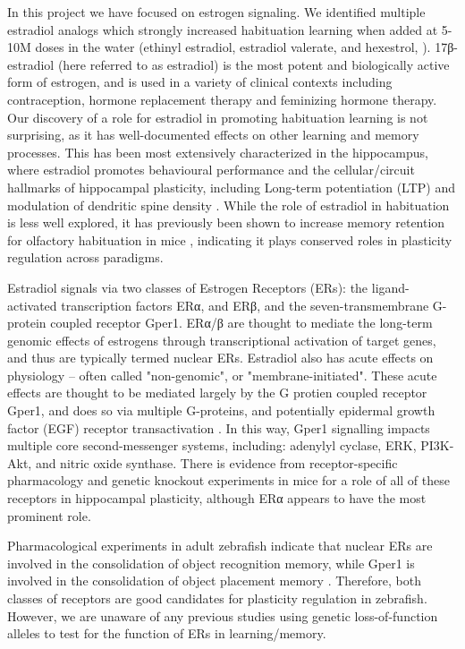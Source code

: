 \documentclass[9pt,lineno]{RandlettLab_elife}
\begin{document}
In this project we have focused on estrogen signaling. 
We identified multiple estradiol analogs which strongly increased habituation learning when added at 5-10\textmu M doses in the water (ethinyl estradiol, estradiol valerate, and hexestrol, \citealp{Lamire2023-he}).
17β-estradiol (here referred to as estradiol) is the most potent and biologically active form of estrogen, and is used in a variety of clinical contexts including contraception, hormone replacement therapy and feminizing hormone therapy. 
Our discovery of a role for estradiol in promoting habituation learning is not surprising, as it has well-documented effects on other learning and memory processes. 
This has been most extensively characterized in the hippocampus, where estradiol promotes behavioural performance and the cellular/circuit hallmarks of hippocampal plasticity, including Long-term potentiation (LTP) and modulation of dendritic spine density \citep{Iqbal2024-yo, Luine2014-cj, Finney2020-ng, Nilsson2002-hs}. 
While the role of estradiol in habituation is less well explored, it has previously been shown to increase memory retention for olfactory habituation in mice \citep{Dillon2013-rk}, indicating it plays conserved roles in plasticity regulation across paradigms.

Estradiol signals via two classes of Estrogen Receptors (ERs): the ligand-activated transcription factors ERα, and ERβ, and the seven-transmembrane G-protein coupled receptor Gper1.
ERα/β are thought to mediate the long-term genomic effects of estrogens through transcriptional activation of target genes, and thus are typically termed nuclear ERs.
Estradiol also has acute effects on physiology -- often called "non-genomic", or "membrane-initiated". 
These acute effects are thought to be mediated largely by the G protien coupled receptor Gper1, and does so via multiple G-proteins, and potentially epidermal growth factor (EGF) receptor transactivation \citep{Prossnitz2023-uo, Revankar2005-ww, Filardo2000-yz}.
In this way, Gper1 signalling impacts multiple core second-messenger systems, including: adenylyl cyclase, ERK, PI3K-Akt, and nitric oxide synthase. 
There is evidence from receptor-specific pharmacology and genetic knockout experiments in mice for a role of all of these receptors in hippocampal plasticity, although ERα appears to have the most prominent role. 

Pharmacological experiments in adult zebrafish indicate that nuclear ERs are involved in the consolidation of object recognition memory, while Gper1 is involved in the consolidation of object placement memory \citep{Naderi2020-cg}. 
Therefore, both classes of receptors are good candidates for plasticity regulation in zebrafish. However, we are unaware of any previous studies using genetic loss-of-function alleles to test for the function of ERs in learning/memory. 
\end{document}

